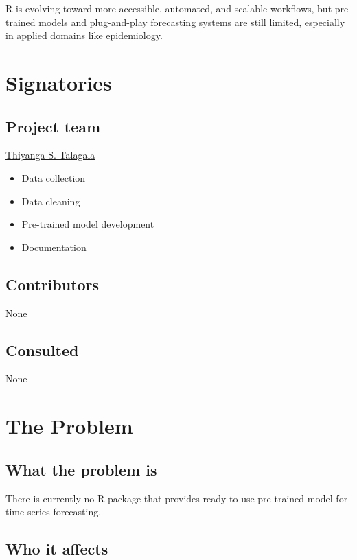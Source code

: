 \documentclass[
]{article}
\begin{document}
R is evolving toward more accessible, automated, and scalable workflows,
but pre-trained models and plug-and-play forecasting systems are still
limited, especially in applied domains like epidemiology.

\section{Signatories}\label{signatories}

\subsection{Project team}\label{project-team}

\href{https://thiyanga.netlify.app/}{Thiyanga S. Talagala}

\begin{itemize}
\item
  Data collection
\item
  Data cleaning
\item
  Pre-trained model development
\item
  Documentation
\end{itemize}

\subsection{Contributors}\label{contributors}

None

\subsection{Consulted}\label{consulted}

None

\section{The Problem}\label{the-problem}

\subsection{What the problem is}\label{what-the-problem-is}

There is currently no R package that provides ready-to-use pre-trained
model for time series forecasting.

\subsection{Who it affects}\label{who-it-affects}
\end{document}
